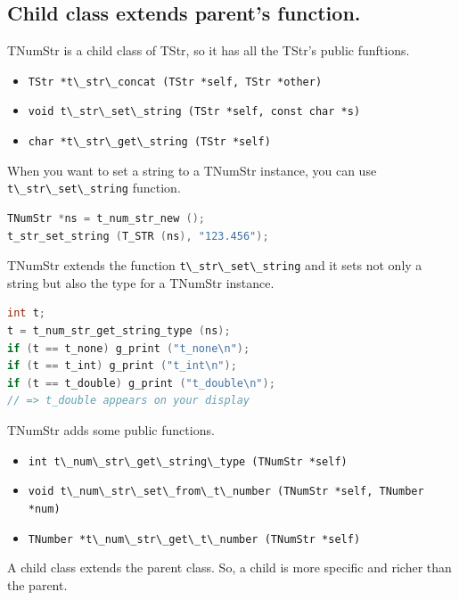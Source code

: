 \subsection{Child class extends parent's
function.}\label{child-class-extends-parents-function.}

TNumStr is a child class of TStr, so it has all the TStr's public
funftions.

\begin{itemize}
\tightlist
\item
  \passthrough{\lstinline!TStr *t\_str\_concat (TStr *self, TStr *other)!}
\item
  \passthrough{\lstinline!void t\_str\_set\_string (TStr *self, const char *s)!}
\item
  \passthrough{\lstinline!char *t\_str\_get\_string (TStr *self)!}
\end{itemize}

When you want to set a string to a TNumStr instance, you can use
\passthrough{\lstinline!t\_str\_set\_string!} function.

\begin{lstlisting}[language=C]
TNumStr *ns = t_num_str_new ();
t_str_set_string (T_STR (ns), "123.456");
\end{lstlisting}

TNumStr extends the function
\passthrough{\lstinline!t\_str\_set\_string!} and it sets not only a
string but also the type for a TNumStr instance.

\begin{lstlisting}[language=C]
int t;
t = t_num_str_get_string_type (ns);
if (t == t_none) g_print ("t_none\n");
if (t == t_int) g_print ("t_int\n");
if (t == t_double) g_print ("t_double\n");
// => t_double appears on your display
\end{lstlisting}

TNumStr adds some public functions.

\begin{itemize}
\tightlist
\item
  \passthrough{\lstinline!int t\_num\_str\_get\_string\_type (TNumStr *self)!}
\item
  \passthrough{\lstinline!void t\_num\_str\_set\_from\_t\_number (TNumStr *self, TNumber *num)!}
\item
  \passthrough{\lstinline!TNumber *t\_num\_str\_get\_t\_number (TNumStr *self)!}
\end{itemize}

A child class extends the parent class. So, a child is more specific and
richer than the parent.

